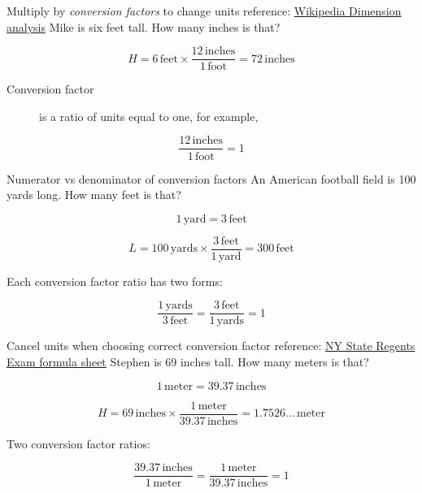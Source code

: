\begin{frame}{Multiply by \emph{conversion factors} to change units}
  {reference: \href{https://en.wikipedia.org/wiki/Dimensional_analysis}{Wikipedia Dimension analysis}}
  Mike is six feet tall. How many inches is that? \par \medskip
  $$H = 6 \,\mathrm{feet} \times \displaystyle \frac{12 \,\mathrm{inches}}{1 \,\mathrm{foot}} = 72 \,\mathrm{inches}$$
  \begin{description}
    \item[Conversion factor] is a ratio of units equal to one, for example, 
  \end{description}
  $$\displaystyle \frac{12 \,\mathrm{inches}}{1 \,\mathrm{foot}} = 1$$
    \vspace{3cm}
  \end{frame}

\begin{frame}{Numerator vs denominator of conversion factors}
  An American football field is 100 yards long. How many feet is that?  \par \smallskip
  $$1 \,\mathrm{yard} = 3 \,\mathrm{feet}$$ \par \medskip
   $$L = 100 \,\mathrm{yards} \times \displaystyle \frac{3 \,\mathrm{feet}}{1 \,\mathrm{yard}} = 300 \,\mathrm{feet}$$ \par \vspace{1cm}
  Each conversion factor ratio has two forms: \par \medskip
  $$\displaystyle  \frac{1 \,\mathrm{yards}}{3 \,\mathrm{feet}} = \frac{3 \,\mathrm{feet}}{1 \,\mathrm{yards}} = 1$$
  \end{frame}

\begin{frame}{Cancel units when choosing correct conversion factor}
  {reference: \href{https://www.nysedregents.org/geometryre/622/geom62022-exam.pdf}{NY State Regents Exam formula sheet}}
  Stephen is 69 inches tall. How many meters is that? \par \smallskip
   $$1 \,\mathrm{meter} = 39.37 \,\mathrm{inches}$$ \par \medskip
    $$H = 69 \,\mathrm{inches} \times \displaystyle \frac{1 \,\mathrm{meter}}{39.37 \,\mathrm{inches}} = 1.7526\dots \,\mathrm{meter}$$ \par \vspace{1cm}
    Two conversion factor ratios: \par \medskip
      $$\displaystyle  \frac{39.37 \,\mathrm{inches}}{1 \,\mathrm{meter}} = \frac{1 \,\mathrm{meter}}{39.37 \,\mathrm{inches}} = 1$$
  \end{frame}


